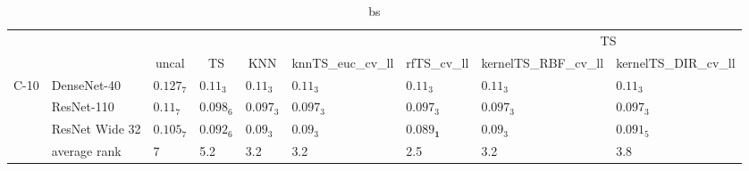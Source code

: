 \begin{table*}
\caption{bs}
\label{table:bs}
\centering
\begin{adjustbox}{width=\textwidth}

\begin{tabular}{lllllllll}
\toprule
\multicolumn{7}{c}{}&\multicolumn{2}{c}{TS}\\
\cmidrule{8-9}
\multicolumn{1}{c}{}&\multicolumn{1}{c}{}&\multicolumn{1}{c}{uncal}&\multicolumn{1}{c}{TS}&\multicolumn{1}{c}{KNN}&\multicolumn{1}{c}{knnTS_euc_cv_ll}&\multicolumn{1}{c}{rfTS_cv_ll}&\multicolumn{1}{c}{kernelTS_RBF_cv_ll}&\multicolumn{1}{c}{kernelTS_DIR_cv_ll}\\\midrule
C-10 & DenseNet-40 &  $0.127_{7}$ &   $0.11_{3}$ &   $0.11_{3}$ &      $0.11_{3}$ &            $0.11_{3}$ &         $0.11_{3}$ &         $0.11_{3}$ \\
     & ResNet-110 &   $0.11_{7}$ &  $0.098_{6}$ &  $0.097_{3}$ &     $0.097_{3}$ &           $0.097_{3}$ &        $0.097_{3}$ &        $0.097_{3}$ \\
     & ResNet Wide 32 &  $0.105_{7}$ &  $0.092_{6}$ &   $0.09_{3}$ &      $0.09_{3}$ &  $\mathbf{0.089_{1}}$ &         $0.09_{3}$ &        $0.091_{5}$ \\
\cmidrule{2-9}
     & average rank &            7 &          5.2 &          3.2 &             3.2 &                   2.5 &                3.2 &                3.8 \\
\cmidrule{1-9}
\bottomrule
\end{tabular}


\end{adjustbox}
\end{table*}
